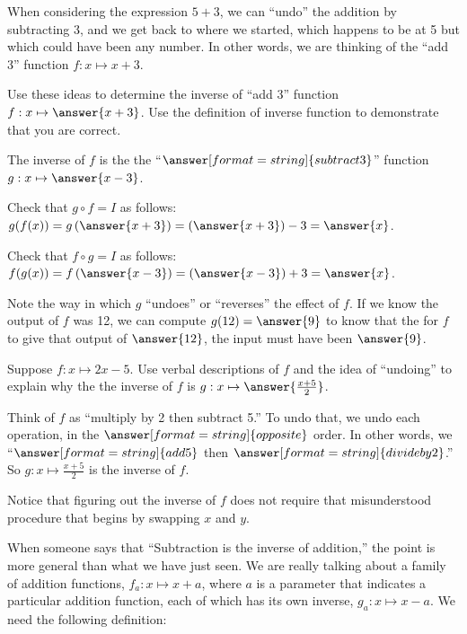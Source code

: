 \documentclass{ximera}
\begin{document}
When considering the expression $5+3$, we can ``undo'' the addition by subtracting 3, and we get back to where we started, which happens to be at 5 but which could have been any number.  In other words, we are thinking of the ``add 3'' function $f:x\mapsto x+3$.  
\begin{question}
Use these ideas to determine the inverse of ``add 3'' function $f:x\mapsto \answer{x+3}$. Use the definition of inverse function to demonstrate that you are correct.  
\begin{solution}
The inverse of $f$ is the the ``$\answer[format=string]{subtract 3}$'' function $g:x\mapsto \answer{x-3}$.  

Check that $g\circ f=I$ as follows:  $g(f(x))=g\left(\answer{x+3}\right)=\left(\answer{x+3}\right)-3=\answer{x}$.  

Check that $f\circ g = I$ as follows:  $f(g(x))=f\left(\answer{x-3}\right)=\left(\answer{x-3}\right)+3=\answer{x}$.  
\end{solution}
\end{question}

\begin{question}
Note the way in which $g$ ``undoes'' or ``reverses'' the effect of $f$.  If we know the output of $f$ was 12, we can compute $g(12)=\answer{9}$ to know that the for $f$ to give that output of $\answer{12}$, the input must have been $\answer{9}$.  
\end{question}

\begin{question}
Suppose $f:x\mapsto 2x-5$.  Use verbal descriptions of $f$ and the idea of ``undoing'' to explain why the the inverse of $f$ is $g:x\mapsto \answer{\frac{x+5}{2}}$.  
\begin{question}
Think of $f$ as ``multiply by 2 then subtract 5.'' To undo that, we undo each operation, in the 
$\answer[format=string]{opposite}$ order.  In other words, we 
``$\answer[format=string]{add 5}$ then $\answer[format=string]{divide by 2}$.''  So $g:x\mapsto \frac{x+5}{2}$ is the inverse of $f$.  
\end{question}
\end{question}

\begin{remark}
Notice that figuring out the inverse of $f$ does not require that misunderstood procedure that begins by swapping $x$ and $y$.  
\end{remark}

When someone says that ``Subtraction is the inverse of addition,'' the point is more general than what we have just seen.  We are really talking about a family of addition functions, $f_a:x\mapsto x+a$, where $a$ is a parameter that indicates a particular addition function, each of which has its own inverse, $g_a:x\mapsto x-a$.  We need the following definition:  
\end{document}
